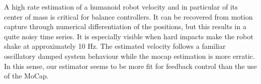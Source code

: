 A high rate estimation of a humanoid robot velocity and in particular of its center of mass is critical for balance controllers. It can be recovered from motion capture through numerical differentiation of the positions, but this results in a quite noisy time series. It is especially visible when hard impacts make the robot shake at approximately 10 Hz. The estimated velocity follows a familiar oscillatory damped system behaviour while the mocap estimation is more erratic. In this sense, our estimator seems to be more fit for feedback control than the use of the MoCap.


